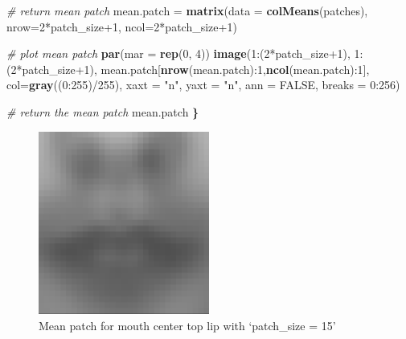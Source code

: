\documentclass[]{article}
\newenvironment{Shaded}{\begin{snugshade}}{\end{snugshade}}
\newcommand{\KeywordTok}[1]{\textcolor[rgb]{0.13,0.29,0.53}{\textbf{{#1}}}}
\newcommand{\DataTypeTok}[1]{\textcolor[rgb]{0.13,0.29,0.53}{{#1}}}
\newcommand{\DecValTok}[1]{\textcolor[rgb]{0.00,0.00,0.81}{{#1}}}
\newcommand{\StringTok}[1]{\textcolor[rgb]{0.31,0.60,0.02}{{#1}}}
\newcommand{\CommentTok}[1]{\textcolor[rgb]{0.56,0.35,0.01}{\textit{{#1}}}}
\newcommand{\OtherTok}[1]{\textcolor[rgb]{0.56,0.35,0.01}{{#1}}}
\newcommand{\ErrorTok}[1]{\textcolor[rgb]{0.64,0.00,0.00}{\textbf{{#1}}}}
\newcommand{\NormalTok}[1]{{#1}}
\begin{document}
\begin{Shaded}
\begin{Highlighting}[]
  \CommentTok{# return mean patch}
  \NormalTok{mean.patch =}\StringTok{ }\KeywordTok{matrix}\NormalTok{(}\DataTypeTok{data =} \KeywordTok{colMeans}\NormalTok{(patches), }\DataTypeTok{nrow=}\DecValTok{2}\NormalTok{*patch_size}\DecValTok{+1}\NormalTok{, }\DataTypeTok{ncol=}\DecValTok{2}\NormalTok{*patch_size}\DecValTok{+1}\NormalTok{)}

  \CommentTok{# plot mean patch}
  \KeywordTok{par}\NormalTok{(}\DataTypeTok{mar =} \KeywordTok{rep}\NormalTok{(}\DecValTok{0}\NormalTok{, }\DecValTok{4}\NormalTok{))}
  \KeywordTok{image}\NormalTok{(}\DecValTok{1}\NormalTok{:(}\DecValTok{2}\NormalTok{*patch_size}\DecValTok{+1}\NormalTok{), }\DecValTok{1}\NormalTok{:(}\DecValTok{2}\NormalTok{*patch_size}\DecValTok{+1}\NormalTok{),}
        \NormalTok{mean.patch[}\KeywordTok{nrow}\NormalTok{(mean.patch):}\DecValTok{1}\NormalTok{,}\KeywordTok{ncol}\NormalTok{(mean.patch):}\DecValTok{1}\NormalTok{],}
        \DataTypeTok{col=}\KeywordTok{gray}\NormalTok{((}\DecValTok{0}\NormalTok{:}\DecValTok{255}\NormalTok{)/}\DecValTok{255}\NormalTok{), }\DataTypeTok{xaxt =} \StringTok{"n"}\NormalTok{, }\DataTypeTok{yaxt =} \StringTok{"n"}\NormalTok{, }\DataTypeTok{ann =} \OtherTok{FALSE}\NormalTok{, }\DataTypeTok{breaks =} \DecValTok{0}\NormalTok{:}\DecValTok{256}\NormalTok{)}

  \CommentTok{# return the mean patch}
  \NormalTok{mean.patch}
\ErrorTok{\}}
\end{Highlighting}
\end{Shaded}

\begin{figure}
\centering
\includegraphics[width=0.5\textwidth]{figures/mouth_15.pdf}
\caption{Mean patch for mouth center top lip with `patch\_size = 15'}
\end{figure}
\end{document}

